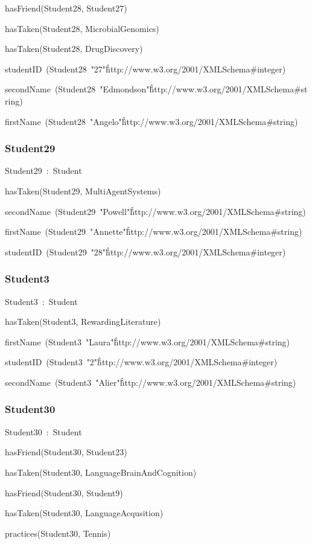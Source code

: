 \documentclass{article}
\begin{document}
hasFriend(Student28, Student27)

hasTaken(Student28, MicrobialGenomics)

hasTaken(Student28, DrugDiscovery)

studentID~(Student28~"27"\^\^http://www.w3.org/2001/XMLSchema#integer)

secondName~(Student28~"Edmondson"\^\^http://www.w3.org/2001/XMLSchema#string)

firstName~(Student28~"Angelo"\^\^http://www.w3.org/2001/XMLSchema#string)

\subsubsection*{Student29}

Student29~:~Student

hasTaken(Student29, MultiAgentSystems)

secondName~(Student29~"Powell"\^\^http://www.w3.org/2001/XMLSchema#string)

firstName~(Student29~"Annette"\^\^http://www.w3.org/2001/XMLSchema#string)

studentID~(Student29~"28"\^\^http://www.w3.org/2001/XMLSchema#integer)

\subsubsection*{Student3}

Student3~:~Student

hasTaken(Student3, RewardingLiterature)

firstName~(Student3~"Laura"\^\^http://www.w3.org/2001/XMLSchema#string)

studentID~(Student3~"2"\^\^http://www.w3.org/2001/XMLSchema#integer)

secondName~(Student3~"Alier"\^\^http://www.w3.org/2001/XMLSchema#string)

\subsubsection*{Student30}

Student30~:~Student

hasFriend(Student30, Student23)

hasTaken(Student30, LanguageBrainAndCognition)

hasFriend(Student30, Student9)

hasTaken(Student30, LanguageAcqusition)

practices(Student30, Tennis)
\end{document}
